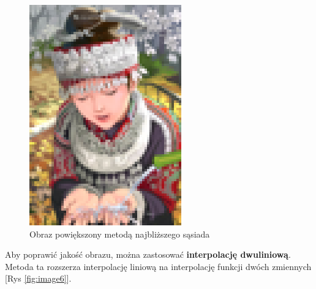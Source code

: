\begin{figure}[ht]
\begin{minipage}[t]{0.32\linewidth}
        \includegraphics[width=\linewidth]{Rozdziały/02.Podstawy_teoretyczne/comic_NN_x4.png}
        \caption{Obraz powiększony metodą najbliższego sąsiada}
        \label{fig:image5}
    \end{minipage}
  \end{figure}


Aby poprawić jakość obrazu, można zastosować \textbf{interpolację dwuliniową}. Metoda ta rozszerza interpolację liniową na interpolację funkcji dwóch zmiennych [Rys \ref{fig:image6}]. 

